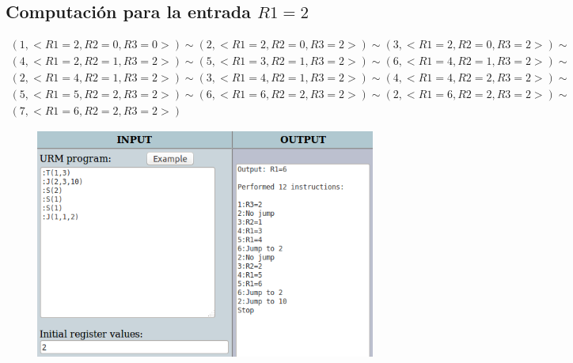 	\subsection{Computación para la entrada $R1=2$}
	\begin{equation*}\begin{gathered}
	(1, <R1=2, R2=0, R3=0>) \sim (2, <R1=2, R2=0, R3=2>) \sim (3, <R1=2, R2=0, R3=2>) \sim\\
	(4, <R1=2, R2=1, R3=2>) \sim (5, <R1=3, R2=1, R3=2>) \sim (6, <R1=4, R2=1, R3=2>) \sim\\
	(2, <R1=4, R2=1, R3=2>) \sim (3, <R1=4, R2=1, R3=2>) \sim (4, <R1=4, R2=2, R3=2>) \sim\\
	(5, <R1=5, R2=2, R3=2>) \sim (6, <R1=6, R2=2, R3=2>) \sim (2, <R1=6, R2=2, R3=2>) \sim\\
	(7, <R1=6, R2=2, R3=2>)
	\end{gathered}\end{equation*}
	\begin{figure}[H]
  		\centering
  		\includegraphics[scale=0.5]{images/82.png}
  	\end{figure}
